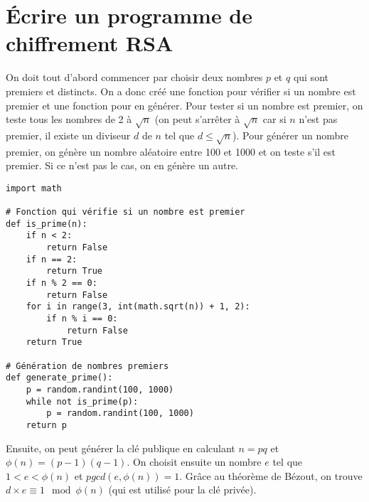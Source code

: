 \section{Écrire un programme de chiffrement RSA}

On doit tout d'abord commencer par choisir deux nombres $p$ et $q$ qui sont premiers et distincts. On a donc créé une fonction pour vérifier si un nombre est premier et une fonction pour en générer. Pour tester si un nombre est premier, on teste tous les nombres de 2 à $\sqrt{n}$ (on peut s'arrêter à $\sqrt{n}$ car si $n$ n'est pas premier, il existe un diviseur $d$ de $n$ tel que $d \leq \sqrt{n}$). Pour générer un nombre premier, on génère un nombre aléatoire entre 100 et 1000 et on teste s'il est premier. Si ce n'est pas le cas, on en génère un autre. \\

\begin{tcolorbox}[
    enhanced,
    attach boxed title to top left={xshift=6mm,yshift=-3mm},
    colback=lightgreen!20,
    colframe=lightgreen,
    colbacktitle=lightgreen,
    title=Test de primalité et génération de nombres premiers,
    fonttitle=\bfseries\color{black},
    boxed title style={size=small,colframe=lightgreen,sharp corners},
    sharp corners,
]    
    \begin{verbatim}
import math

# Fonction qui vérifie si un nombre est premier
def is_prime(n):
    if n < 2:
        return False
    if n == 2:
        return True
    if n % 2 == 0:
        return False
    for i in range(3, int(math.sqrt(n)) + 1, 2):
        if n % i == 0:
            return False
    return True

# Génération de nombres premiers
def generate_prime():
    p = random.randint(100, 1000)
    while not is_prime(p):
        p = random.randint(100, 1000)
    return p
    \end{verbatim}
\end{tcolorbox}

Ensuite, on peut générer la clé publique en calculant $n = pq$ et $\phi(n) = (p-1)(q-1)$. On choisit ensuite un nombre $e$ tel que $1 < e < \phi(n)$ et $pgcd(e, \phi(n)) = 1$. Grâce au théorème de Bézout, on trouve $d \times e \equiv 1 \mod \phi(n)$ (qui est utilisé pour la clé privée). \\

